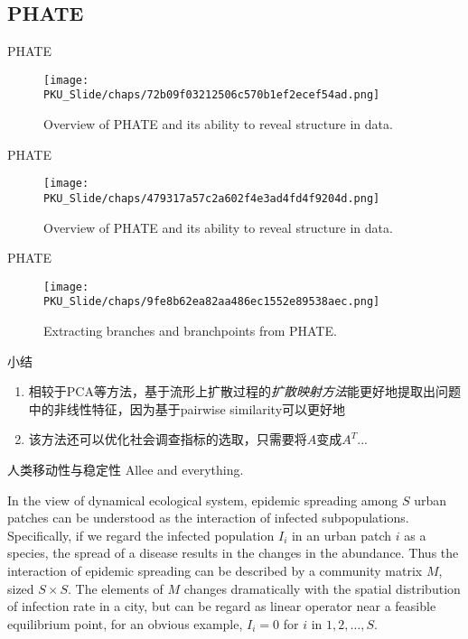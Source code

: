 \subsection{PHATE}
\begin{frame}{PHATE}
    \begin{figure}
        \centering
        \texttt{[image: PKU\_Slide/chaps/72b09f03212506c570b1ef2ecef54ad.png]}
        \caption{Overview of PHATE and its ability to reveal structure in data.}
    \end{figure}
\end{frame}

\begin{frame}{PHATE}
    \begin{figure}
        \centering
        \texttt{[image: PKU\_Slide/chaps/479317a57c2a602f4e3ad4fd4f9204d.png]}
        \caption{Overview of PHATE and its ability to reveal structure in data.}
    \end{figure}
\end{frame}

\begin{frame}{PHATE}
    \begin{figure}
        \centering
        \texttt{[image: PKU\_Slide/chaps/9fe8b62ea82aa486ec1552e89538aec.png]}
        \caption{Extracting branches and branchpoints from PHATE.}
    \end{figure}
\end{frame}

\begin{frame}{小结}
\begin{enumerate}
    \item 相较于PCA等方法，基于流形上扩散过程的\textit{扩散映射方法}能更好地提取出问题中的非线性特征，因为基于pairwise similarity可以更好地
    \item 该方法还可以优化社会调查指标的选取，只需要将$A$变成$A^T$... 
\end{enumerate}
\end{frame}

\begin{frame}{人类移动性与稳定性}
    Allee and everything.
    
    In the view of dynamical ecological system, epidemic spreading among $S$ urban patches can be understood as the interaction of infected subpopulations. Specifically, if we regard the infected population $I_{i}$ in an urban patch $i$ as a species, the spread of a disease results in the changes in the abundance. Thus the interaction of epidemic spreading can be described by a community matrix $M$, sized $S\times S$. The elements of $M$ changes dramatically with the spatial distribution of infection rate in a city, but can be regard as linear operator near a feasible equilibrium point, for an obvious example, $I_{i} = 0$ for $i$ in $1,2,\dots, S$.
    
\end{frame}